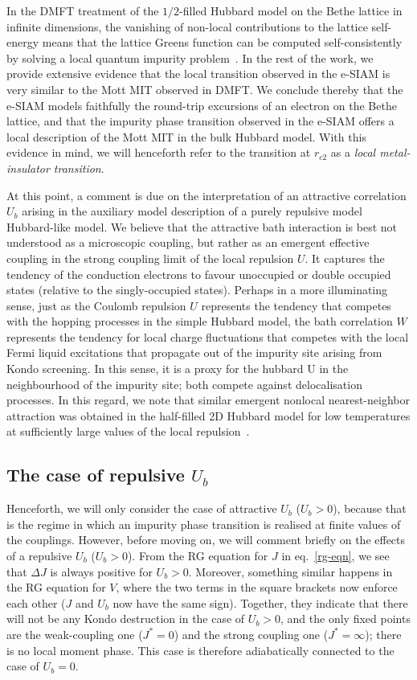 In the DMFT treatment of the $1/2$-filled Hubbard model on the Bethe lattice in infinite dimensions, the vanishing of non-local contributions to the lattice self-energy means that the lattice Greens function can be computed self-consistently by solving a local quantum impurity problem~\cite{georges1996}. In the rest of the work, we provide extensive evidence that the local transition observed in the e-SIAM is very similar to the Mott MIT observed in DMFT. We conclude thereby that the e-SIAM models faithfully the round-trip excursions of an electron on the Bethe lattice, and that the impurity phase transition observed in the e-SIAM offers a local description of the Mott MIT in the bulk Hubbard model. With this evidence in mind, we will henceforth refer to the transition at \(r_{c2}\) as a {\it local metal-insulator transition}.

{\color{\hicol}
At this point, a comment is due on the interpretation of an attractive correlation \(U_b\) arising in the auxiliary model description of a purely repulsive model Hubbard-like model. We believe that the attractive bath interaction is best not understood as a microscopic coupling, but rather as an emergent effective coupling in the strong coupling limit of the local repulsion \(U\). It captures the tendency of the conduction electrons to favour unoccupied or double occupied states (relative to the singly-occupied states). Perhaps in a more illuminating sense, just as the Coulomb repulsion \(U\) represents the tendency that competes with the hopping processes in the simple Hubbard model, the bath correlation \(W\) represents the tendency for local charge fluctuations that competes with the local Fermi liquid excitations that propagate out of the impurity site arising from Kondo screening. In this sense, it is a proxy for the hubbard U in the neighbourhood of the impurity site; both compete against delocalisation processes. In this regard, we note that similar emergent nonlocal nearest-neighbor attraction was obtained in the half-filled 2D Hubbard model for low temperatures at sufficiently large values of the local repulsion~\cite{gazizovaleblanc2023}.
}


\subsection{The case of repulsive \(U_b\)}
Henceforth, we will only consider the case of attractive \(U_b\) (\(U_b > 0\)), because that is the regime in which an impurity phase transition is realised at finite values of the couplings. However, before moving on, we will comment briefly on the effects of a repulsive \(U_b\) (\(U_b > 0\)). From the RG equation for \(J\) in eq.~\ref{rg-eqn}, we see that \(\Delta J\) is always positive for \(U_b > 0\). Moreover, something similar happens in the RG equation for \(V\), where the two terms in the square brackets now enforce each other (\(J\) and \(U_b\) now have the same sign). Together, they indicate that there will not be any Kondo destruction in the case of \(U_b > 0\), and the only fixed points are the weak-coupling one (\(J^* = 0\)) and the strong coupling one (\(J^* = \infty\)); there is no local moment phase. This case is therefore adiabatically connected to the case of \(U_b = 0\).


